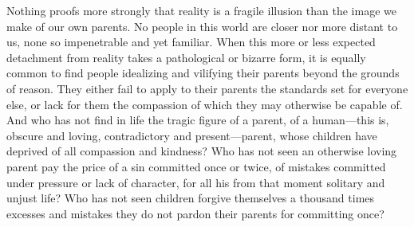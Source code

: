 \documentclass[a4paper, 12pt]{article}
\begin{document}
Nothing proofs more strongly that reality is a fragile illusion than the image
we make of our own parents. No people in this world are closer nor more distant
to us, none so impenetrable and yet familiar. When this more or less expected
detachment from reality takes a pathological or bizarre form, it is equally
common to find people idealizing and vilifying their parents beyond the grounds
of reason. They either fail to apply to their parents the standards set for
everyone else, or lack for them the compassion of which they may otherwise be
capable of. And who has not find in life the tragic figure of a parent, of a
human---this is, obscure and loving, contradictory and present---parent, whose
children have deprived of all compassion and kindness? Who has not seen an
otherwise loving parent pay the price of a sin committed once or twice, of
mistakes committed under pressure or lack of character, for all his from that
moment solitary and unjust life? Who has not seen children forgive themselves a
thousand times excesses and mistakes they do not pardon their parents for
committing once? 
\end{document}

